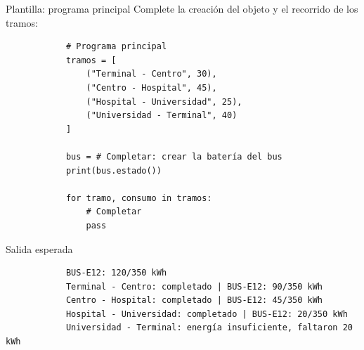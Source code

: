 \documentclass{beamer}
\begin{document}
    \begin{frame}[fragile, t]{Plantilla: programa principal}
        Complete la creación del objeto y el recorrido de los tramos:
        \begin{verbatim}
            # Programa principal
            tramos = [
                ("Terminal - Centro", 30),
                ("Centro - Hospital", 45),
                ("Hospital - Universidad", 25),
                ("Universidad - Terminal", 40)
            ]

            bus = # Completar: crear la batería del bus
            print(bus.estado())

            for tramo, consumo in tramos:
                # Completar
                pass
        \end{verbatim}
    \end{frame}

    \begin{frame}[fragile, t]{Salida esperada}
        \begin{verbatim}
            BUS-E12: 120/350 kWh
            Terminal - Centro: completado | BUS-E12: 90/350 kWh
            Centro - Hospital: completado | BUS-E12: 45/350 kWh
            Hospital - Universidad: completado | BUS-E12: 20/350 kWh
            Universidad - Terminal: energía insuficiente, faltaron 20 kWh
        \end{verbatim}
    \end{frame}
\end{document}
